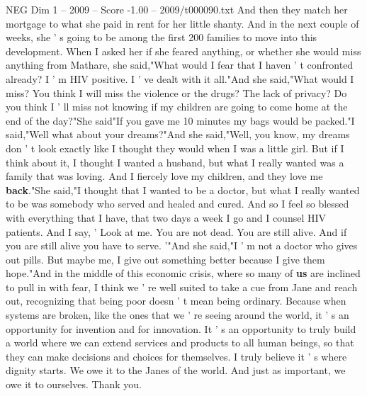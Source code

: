 \begin{textsample}{NEG Dim 1 – 2009 – Score -1.00 – 2009/t000090.txt}
And then they match her mortgage to what she paid in rent for her little shanty.
And in the next couple of weeks, she ' s going to be among the first 200 families to move into this development.
When I asked her if she feared anything, or whether she would miss anything from Mathare, she said,"What would I fear that I haven ' t confronted already?
I ' m HIV positive.
I ' ve dealt with it all."And she said,"What would I miss?
You think I will miss the violence or the drugs?
The lack of privacy?
Do you think I ' ll miss not knowing if my children are going to come home at the end of the day?"She said"If you gave me 10 minutes my bags would be packed."I said,"Well what about your dreams?"And she said,"Well, you know, my dreams don ' t look exactly like I thought they would when I was a little girl.
But if I think about it, I thought I wanted a husband, but what I really wanted was a family that was loving.
And I fiercely love my children, and they love me \textbf{back}."She said,"I thought that I wanted to be a doctor, but what I really wanted to be was somebody who served and healed and cured.
And so I feel so blessed with everything that I have, that two days a week I go and I counsel HIV patients.
And I say, ' Look at me.
You are not dead.
You are still alive.
And if you are still alive you have to serve. '"And she said,"I ' m not a doctor who gives out pills.
But maybe me, I give out something better because I give them hope."And in the middle of this economic crisis, where so many of \textbf{us} are inclined to pull in with fear, I think we ' re well suited to take a cue from Jane and reach out, recognizing that being poor doesn ' t mean being ordinary.
Because when systems are broken, like the ones that we ' re seeing around the world, it ' s an opportunity for invention and for innovation.
It ' s an opportunity to truly build a world where we can extend services and products to all human beings, so that they can make decisions and choices for themselves.
I truly believe it ' s where dignity starts.
We owe it to the Janes of the world.
And just as important, we owe it to ourselves.
Thank you.

\end{textsample}
